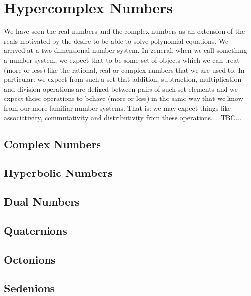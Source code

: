 \section{Hypercomplex Numbers}
We have seen the real numbers and the complex numbers as an extension of the reals motivated by the desire to be able to solve polynomial equations. We arrived at a two dimensional number system. In general, when we call something a number system, we expect that to be some set of objects which we can treat (more or less) like the rational, real or complex numbers that we are used to. In particular: we expect from such a set that addition, subtraction, multiplication and division operations are defined between pairs of such set elements and we expect these operations to behave (more or less) in the same way that we know from our more familiar number systems. That is: we may expect things like associativity, commutativity and distributivity from these operations. ...TBC...



\subsection{Complex Numbers}

\subsection{Hyperbolic Numbers}

\subsection{Dual Numbers}

\subsection{Quaternions}

\subsection{Octonions}

\subsection{Sedenions}







\begin{comment}

-Frame the algebras of hypercomplex numbers as particular subsets of matrices. They can
 all be represented by a constrained set of matrices

\end{comment}